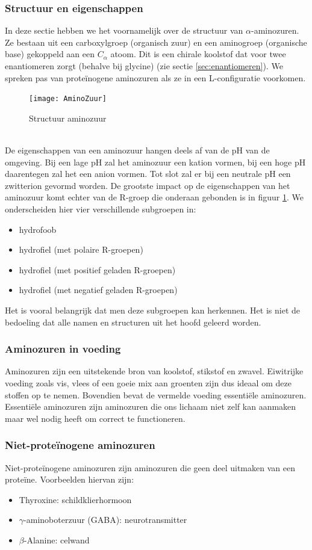 \documentclass[a4paper,kul]{kulakarticle} %
\begin{document}
\subsubsection{Structuur en eigenschappen}
In deze sectie hebben we het voornamelijk over de structuur van $\alpha$-aminozuren. Ze bestaan uit een carboxylgroep (organisch zuur) en een aminogroep (organische base) gekoppeld aan een $C_{\alpha}$ atoom. Dit is een chirale koolstof dat voor twee enantiomeren zorgt (behalve bij glycine) (zie sectie \ref{sec:enantiomeren}). We spreken pas van proteïnogene aminozuren als ze in een L-configuratie voorkomen. 
\begin{figure}[h]
	\centering
	\texttt{[image: AminoZuur]}
	\caption[Aminozuur]{Structuur aminozuur}
	\label{fig:aminozuur}
\end{figure}\\
De eigenschappen van een aminozuur hangen deels af van de pH van de omgeving. Bij een lage pH zal het aminozuur een kation vormen, bij een hoge pH daarentegen zal het een anion vormen. Tot slot zal er bij een neutrale pH een zwitterion gevormd worden. De grootste impact op de eigenschappen van het aminozuur komt echter van de R-groep die onderaan gebonden is in figuur \ref{fig:aminozuur}. We onderscheiden hier vier verschillende subgroepen in: 
\begin{itemize}
	\item hydrofoob
	\item hydrofiel (met polaire R-groepen)
	\item hydrofiel (met positief geladen R-groepen)
	\item hydrofiel (met negatief geladen R-groepen)
\end{itemize} 
Het is vooral belangrijk dat men deze subgroepen kan herkennen. Het is niet de bedoeling dat alle namen en structuren uit het hoofd geleerd worden. 
\subsubsection{Aminozuren in voeding}
Aminozuren zijn een uitstekende bron van koolstof, stikstof en zwavel. Eiwitrijke voeding zoals vis, vlees of een goeie mix aan groenten zijn dus ideaal om deze stoffen op te nemen. Bovendien bevat de vermelde voeding essentiële aminozuren. Essentiële aminozuren zijn aminozuren die ons lichaam niet zelf kan aanmaken maar wel nodig heeft om correct te functioneren. 
\subsubsection{Niet-proteïnogene aminozuren}
Niet-proteïnogene aminozuren zijn aminozuren die geen deel uitmaken van een proteïne. Voorbeelden hiervan zijn:
\begin{itemize}
	\item Thyroxine: schildklierhormoon
	\item $\gamma$-aminoboterzuur (GABA): neurotransmitter
	\item $\beta$-Alanine: celwand
\end{itemize}
\end{document}
